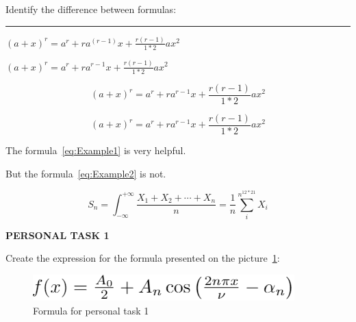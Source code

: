 \documentclass[a4paper]{article}
\begin{document}
Identify the difference between formulas:
\bigskip

\hrule
\medskip

\large

$(a+x)^r=a^r+ra^(r-1)x+\frac{r(r-1)}{1*2}ax^2$

\bigskip

$(a+x)^r=a^r+ra^{r-1}x+\frac{r(r-1)}{1*2}ax^2$

\begin{equation}
(a+x)^r=a^r+ra^{r-1}x+\frac{r(r-1)}{1*2}ax^2    
\label{eq:Example1}    
\end{equation}

\begin{equation*}
(a+x)^r=a^r+ra^{r-1}x+\frac{r(r-1)}{1*2}ax^2    
\label{eq:Example2}    
\end{equation*}

\bigskip
The formula~\ref{eq:Example1} is very helpful.

But the formula~\ref{eq:Example2} is not.


\[S_n = \int_{-\infty}^{+\infty}\frac{X_1 + X_2 + \cdots + X_n}{n}
      = \frac{1}{n}\sum_{i}^{n^{12*21}} X_i\]

\vspace{2cm}

\textbf{PERSONAL TASK 1}
\bigskip
\rm

Create the expression for the formula presented on the picture~\ref{fig:Pers_Task_1}:

\begin{figure}
    \centering
    \includegraphics[scale=1.1]{Formula}
    \caption{Formula for personal task 1}
    \label{fig:Pers_Task_1}
\end{figure}

\end{document}

